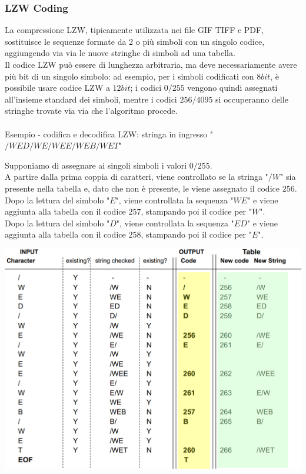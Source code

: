 \documentclass[a4paper,11pt]{article} %
\begin{document}
\subsubsection{LZW Coding}
La compressione LZW, tipicamente utilizzata nei file GIF TIFF e PDF, sostituisce le sequenze formate da 2 o più simboli con un singolo codice, aggiungendo via via le nuove stringhe di simboli ad una tabella. \\
Il codice LZW può essere di lunghezza arbitraria, ma deve necessariamente avere più bit di un singolo simbolo: ad esempio, per i simboli codificati con $8 bit$, è possibile usare codice LZW a $12 bit$; i codici $0/255$ vengono quindi assegnati all'insieme standard dei simboli, mentre i codici $256/4095$ si occuperanno delle stringhe trovate via via che l'algoritmo procede.\\ \\
Esempio - codifica e decodifica LZW: \quad stringa in ingresso "$/WED/WE/WEE/WEB/WET$"\\
\begin{minipage}{0.45\textwidth}
    Supponiamo di assegnare ai singoli simboli i valori $0/255$. \\
    A partire dalla prima coppia di caratteri, viene controllato se la stringa "$/W$" sia presente nella tabella e, dato che non è presente, le viene assegnato il codice $256$.\\
    Dopo la lettura del simbolo "$E$", viene controllata la sequenza "$WE$" e viene aggiunta alla tabella con il codice $257$, stampando poi il codice per "$W$".\\
    Dopo la lettura del simbolo "$D$", viene controllata la sequenza "$ED$" e viene aggiunta alla tabella con il codice $258$, stampando poi il codice per "$E$".
\end{minipage}
\begin{minipage}{0.55\textwidth}
\centering
    \includegraphics[width=\linewidth]{LZW example.png}
\end{minipage}
\end{document}
